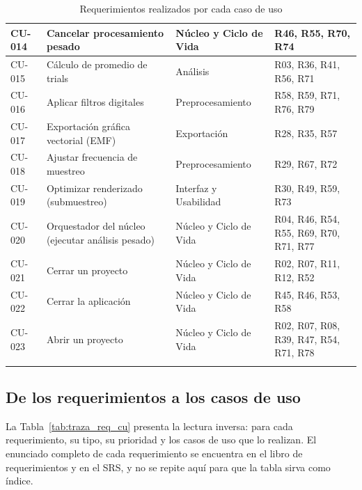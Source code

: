\documentclass[11pt,a4paper]{article}
\DeclareRobustCommand{\_}{\textunderscore\allowbreak}
\begin{document}
\begin{center}
\begin{longtable}{|>{\raggedright\arraybackslash}p{}|>{\raggedright\arraybackslash}p{}|>{\raggedright\arraybackslash}p{}|>{\raggedright\arraybackslash}p{}|}
\hline
CU-014 & Cancelar procesamiento pesado & Núcleo y Ciclo de Vida & R46, R55, R70, R74 \\
\hline
CU-015 & C\'alculo de promedio de trials & Análisis & R03, R36, R41, R56, R71 \\
\hline
CU-016 & Aplicar filtros digitales & Preprocesamiento & R58, R59, R71, R76, R79 \\
\hline
CU-017 & Exportaci\'on gr\'afica vectorial (EMF) & Exportación & R28, R35, R57 \\
\hline
CU-018 & Ajustar frecuencia de muestreo & Preprocesamiento & R29, R67, R72 \\
\hline
CU-019 & Optimizar renderizado (submuestreo) & Interfaz y Usabilidad & R30, R49, R59, R73 \\
\hline
CU-020 & Orquestador del n\'ucleo (ejecutar an\'alisis pesado) & Núcleo y Ciclo de Vida & R04, R46, R54, R55, R69, R70, R71, R77 \\
\hline
CU-021 & Cerrar un proyecto & Núcleo y Ciclo de Vida & R02, R07, R11, R12, R52 \\
\hline
CU-022 & Cerrar la aplicaci\'on & Núcleo y Ciclo de Vida & R45, R46, R53, R58 \\
\hline
CU-023 & Abrir un proyecto & Núcleo y Ciclo de Vida & R02, R07, R08, R39, R47, R54, R71, R78 \\
\hline
\caption{Requerimientos realizados por cada caso de uso} \label{tab:traza_cu_req} \\
\end{longtable}
\end{center}


\subsection{De los requerimientos a los casos de uso}
\label{sec:traza_req_cu}

La Tabla~\ref{tab:traza_req_cu} presenta la lectura inversa: para cada requerimiento, su tipo, su prioridad y los casos de uso que lo realizan. El enunciado completo de cada requerimiento se encuentra en el libro de requerimientos y en el SRS, y no se repite aquí para que la tabla sirva como índice.
\end{document}
